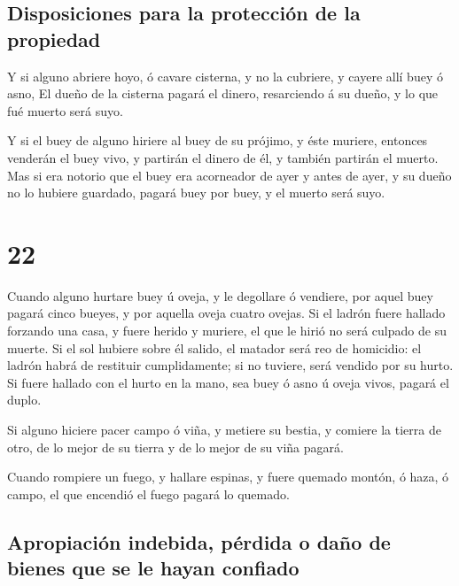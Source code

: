 \hypertarget{disposiciones-para-la-protecciuxf3n-de-la-propiedad}{%
\subsection{Disposiciones para la protección de la
propiedad}\label{disposiciones-para-la-protecciuxf3n-de-la-propiedad}}

 Y si alguno abriere hoyo, ó cavare cisterna, y no la
cubriere, y cayere allí buey ó asno,  El dueño de la
cisterna pagará el dinero, resarciendo á su dueño, y lo que fué muerto
será suyo.

 Y si el buey de alguno hiriere al buey de su prójimo, y
éste muriere, entonces venderán el buey vivo, y partirán el dinero de
él, y también partirán el muerto.  Mas si era notorio que
el buey era acorneador de ayer y antes de ayer, y su dueño no lo hubiere
guardado, pagará buey por buey, y el muerto será suyo.

\hypertarget{section-21}{%
\section{22}\label{section-21}}

 Cuando alguno hurtare buey ú oveja, y le degollare ó
vendiere, por aquel buey pagará cinco bueyes, y por aquella oveja cuatro
ovejas.  Si el ladrón fuere hallado forzando una casa, y
fuere herido y muriere, el que le hirió no será culpado de su muerte.
 Si el sol hubiere sobre él salido, el matador será reo de
homicidio: el ladrón habrá de restituir cumplidamente; si no tuviere,
será vendido por su hurto.  Si fuere hallado con el hurto en
la mano, sea buey ó asno ú oveja vivos, pagará el duplo.

 Si alguno hiciere pacer campo ó viña, y metiere su bestia,
y comiere la tierra de otro, de lo mejor de su tierra y de lo mejor de
su viña pagará.

 Cuando rompiere un fuego, y hallare espinas, y fuere
quemado montón, ó haza, ó campo, el que encendió el fuego pagará lo
quemado.

\hypertarget{apropiaciuxf3n-indebida-puxe9rdida-o-dauxf1o-de-bienes-que-se-le-hayan-confiado}{%
\subsection{Apropiación indebida, pérdida o daño de bienes que se le
hayan
confiado}\label{apropiaciuxf3n-indebida-puxe9rdida-o-dauxf1o-de-bienes-que-se-le-hayan-confiado}}

